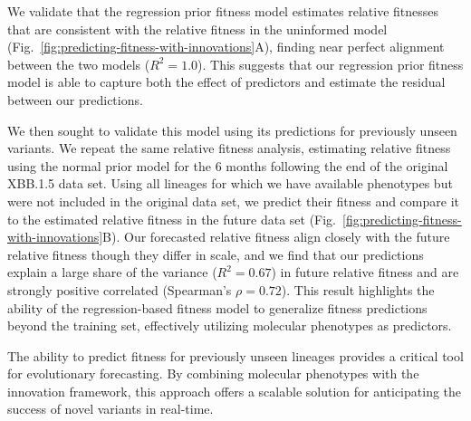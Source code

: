 We validate that the regression prior fitness model estimates relative fitnesses that are consistent with the relative fitness in the uninformed model (Fig.~\ref{fig:predicting-fitness-with-innovations}A), finding near perfect alignment between the two models ($R^2 = 1.0$).
This suggests that our regression prior fitness model is able to capture both the effect of predictors and estimate the residual between our predictions.

We then sought to validate this model using its predictions for previously unseen variants.
We repeat the same relative fitness analysis, estimating relative fitness using the normal prior model for the 6 months following the end of the original XBB.1.5 data set.
Using all lineages for which we have available phenotypes but were not included in the original data set, we predict their fitness and compare it to the estimated relative fitness in the future data set (Fig.~\ref{fig:predicting-fitness-with-innovations}B).
Our forecasted relative fitness align closely with the future relative fitness though they differ in scale, and we find that our predictions explain a large share of the variance ($R^2 = 0.67$) in future relative fitness and are strongly positive correlated (Spearman's $\rho=0.72$).
This result highlights the ability of the regression-based fitness model to generalize fitness predictions beyond the training set, effectively utilizing molecular phenotypes as predictors.

The ability to predict fitness for previously unseen lineages provides a critical tool for evolutionary forecasting.
By combining molecular phenotypes with the innovation framework, this approach offers a scalable solution for anticipating the success of novel variants in real-time.

